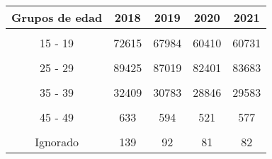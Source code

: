 \begin{tabular}[t]{ccccc}
\toprule
\textbf{Grupos de edad} & \textbf{2018} & \textbf{2019} & \textbf{2020} & \textbf{2021}\\
\midrule
\cellcolor[HTML]{B6B3FF}{Menos de 15} & \cellcolor[HTML]{B6B3FF}{2004} & \cellcolor[HTML]{B6B3FF}{1914} & \cellcolor[HTML]{B6B3FF}{1578} & \cellcolor[HTML]{B6B3FF}{1805}\\
15 - 19 & 72615 & 67984 & 60410 & 60731\\
\cellcolor[HTML]{B6B3FF}{20 - 24} & \cellcolor[HTML]{B6B3FF}{117125} & \cellcolor[HTML]{B6B3FF}{112059} & \cellcolor[HTML]{B6B3FF}{105610} & \cellcolor[HTML]{B6B3FF}{105003}\\
25 - 29 & 89425 & 87019 & 82401 & 83683\\
\cellcolor[HTML]{B6B3FF}{30 - 34} & \cellcolor[HTML]{B6B3FF}{59125} & \cellcolor[HTML]{B6B3FF}{57213} & \cellcolor[HTML]{B6B3FF}{53221} & \cellcolor[HTML]{B6B3FF}{54809}\\
35 - 39 & 32409 & 30783 & 28846 & 29583\\
\cellcolor[HTML]{B6B3FF}{40 - 44} & \cellcolor[HTML]{B6B3FF}{9744} & \cellcolor[HTML]{B6B3FF}{9161} & \cellcolor[HTML]{B6B3FF}{8513} & \cellcolor[HTML]{B6B3FF}{8840}\\
45 - 49 & 633 & 594 & 521 & 577\\
\cellcolor[HTML]{B6B3FF}{50 y más} & \cellcolor[HTML]{B6B3FF}{44} & \cellcolor[HTML]{B6B3FF}{36} & \cellcolor[HTML]{B6B3FF}{31} & \cellcolor[HTML]{B6B3FF}{36}\\
Ignorado & 139 & 92 & 81 & 82\\
\bottomrule
\end{tabular}
